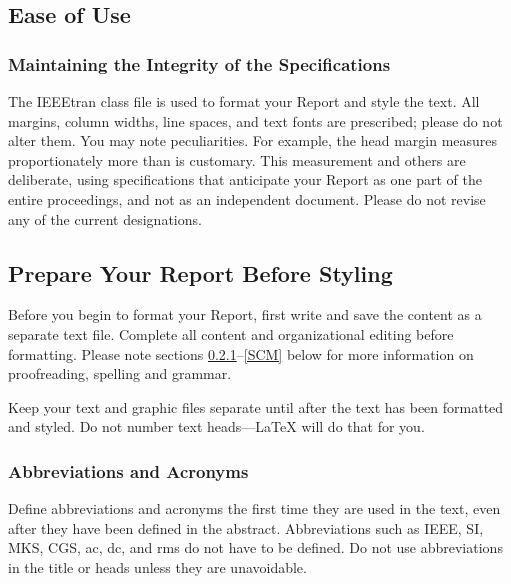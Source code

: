 \documentclass[conference]{IEEEtran}
\begin{document}
\subsection{Ease of Use}

\subsubsection{Maintaining the Integrity of the Specifications}

The IEEEtran class file is used to format your Report and style the text. All margins, 
column widths, line spaces, and text fonts are prescribed; please do not 
alter them. You may note peculiarities. For example, the head margin
measures proportionately more than is customary. This measurement 
and others are deliberate, using specifications that anticipate your Report 
as one part of the entire proceedings, and not as an independent document. 
Please do not revise any of the current designations.

\subsection{Prepare Your Report Before Styling}
Before you begin to format your Report, first write and save the content as a 
separate text file. Complete all content and organizational editing before 
formatting. Please note sections \ref{AA}--\ref{SCM} below for more information on 
proofreading, spelling and grammar.

Keep your text and graphic files separate until after the text has been 
formatted and styled. Do not number text heads---{\LaTeX} will do that 
for you.

\subsubsection{Abbreviations and Acronyms}\label{AA}
Define abbreviations and acronyms the first time they are used in the text, 
even after they have been defined in the abstract. Abbreviations such as 
IEEE, SI, MKS, CGS, ac, dc, and rms do not have to be defined. Do not use 
abbreviations in the title or heads unless they are unavoidable.
\end{document}
